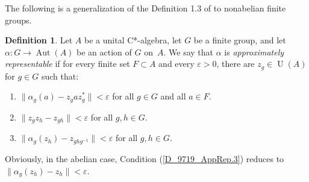 \documentclass[10pt]{amsart}
\numberwithin{equation}{section}
\theoremstyle{definition}
\newtheorem{dfn}[thm]{Definition}
\newcommand{\af}{\alpha}
\newcommand{\ep}{\varepsilon}
\newcommand{\Aut}{{\operatorname{Aut}}}
\newcommand{\U}{{\operatorname{U}}}
\newcommand{\ca}{C*-algebra}
\renewcommand{\S}{\subset}
\begin{document}
%
The following is a generalization of the Definition 1.3 of \cite{Ph15} to nonabelian finite groups.
%
\begin{dfn}
\label{D_9719_AppRep_Phi}
Let $A$ be a unital \ca,
let $G$ be a finite group,
and let $\af \colon G \to \Aut (A)$
be an action of $G$ on~$A$.
We say that $\af$ is
{\emph{approximately representable}}
if for every finite set  $F \S A$ and every $\ep > 0$,
there are  $z_g \in \U (A)$ for $g \in G$ such that:
\begin{enumerate}
\item \label{D_9719_AppRep.1}
$\| \af_g (a) - z_g a z_g^* \| < \ep$ for all $g \in G$ and all $a \in F$.
\item \label{D_9719_AppRep.2}
$\| z_g z_h - z_{gh}\| < \ep$ for all $g, h \in G$.
\item \label{D_9719_AppRep.3}
 $\| \af_g (z_h) - z_{g h g^{-1}}\| < \ep$ for all $g, h \in G$.
\end{enumerate}
\end{dfn}
%
Obviously, in the abelian case,
 Condition (\ref{D_9719_AppRep.3})
reduces to $\| \af_g (z_h) - z_{h}\| < \ep$. 
%
\end{document}
